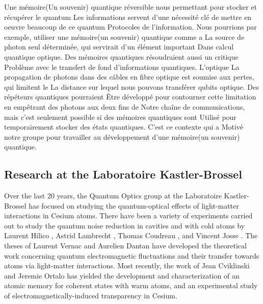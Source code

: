 Une mémoire(Un souvenir) quantique réversible nous permettant pour stocker et récupérer le quantum
Les informations servent d'une nécessité clé de mettre en oeuvre beaucoup de ce quantum
Protocoles de l'information. Nous pourrions par exemple, utiliser une mémoire(un souvenir) quantique comme a
La source de photon seul déterminée, qui servirait d'un élément important
Dans calcul quantique optique. Des mémoires quantiques résoudraient aussi un critique
Problème avec le transfert de fond d'informations quantiques. L'optique
La propagation de photons dans des câbles en fibre optique est soumise aux pertes, qui limitent le
La distance sur lequel nous pouvons transférer qubits optique. Des répéteurs quantiques pourraient
Être développé pour contourner cette limitation en empêtrant des photons aux deux fins de
Notre chaîne de communications, mais c'est seulement possible si des mémoires quantiques sont
Utilisé pour temporairement stocker des états quantiques. C'est ce contexte qui a
Motivé notre groupe pour travailler au développement d'une mémoire(un souvenir) quantique.






\subsection*{Research at the Laboratoire Kastler-Brossel}

Over the last 20 years, the Quantum Optics group at the Laboratoire Kastler-Brossel has focused on studying the quantum-optical effects of light-matter interactions in Cesium atoms.  There have been a variety of experiments carried out to study the quantum noise reduction in cavities and with cold atoms by Laurent Hilico \cite{HilicoPhD}, Astrid Lambrecht \cite{LambrechtPhD}, Thomas Coudreau \cite{CoudreauPhD}, and Vincent Josse \cite{JossePhD}.  The theses of Laurent Vernac \cite{VernacPhD} and Aurelien Dantan \cite{DantanPhD} have developed the theoretical work concerning quantum electromagnetic fluctuations and their transfer towards atoms via light-matter interactions.  Most recently, the work of Jean Cviklinski \cite{CviklinskiPhD} and Jeremie Ortalo \cite{ortalo} has yielded the development and characterization of an atomic memory for coherent states with warm atoms, and an experimental study of electromagnetically-induced transparency in Cesium.


